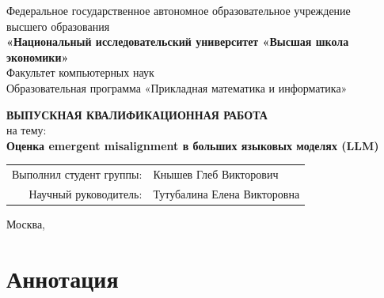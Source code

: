 \documentclass[a4paper,12pt]{extarticle}
\begin{document}
\begin{titlepage}
    \begin{center}
        \vspace*{0.5cm}
        \large
        Федеральное государственное автономное образовательное учреждение\\
        высшего образования\\
        \textbf{«Национальный исследовательский университет «Высшая школа экономики»}\\[0.3cm]
        \normalsize
        Факультет компьютерных наук\\
        Образовательная программа «Прикладная математика и информатика»

        \vfill

        \large
        \textbf{ВЫПУСКНАЯ КВАЛИФИКАЦИОННАЯ РАБОТА}\\
        на тему:\\[0.3cm]
        \LARGE
        \textbf{Оценка emergent misalignment в больших языковых моделях (LLM)}\\

        \vfill

        \begin{flushright}
            \large
            \begin{tabular}{rl}
                Выполнил студент группы: & Кнышев Глеб Викторович \\[0.2cm]
                Научный руководитель: & Тутубалина Елена Викторовна \\[0.2cm]
            \end{tabular}
        \end{flushright}

        \vfill
        \large
        Москва, \the\year
    \end{center}
\end{titlepage}

\setcounter{page}{2}

{
    \hypersetup{linkcolor=black}
    \tableofcontents
}

\newpage

\section*{Аннотация}
\end{document}
